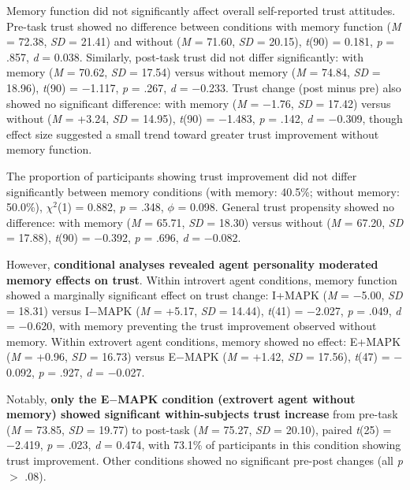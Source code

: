 \documentclass[12pt]{article}
\begin{document}
Memory function did not significantly affect overall self-reported trust attitudes. Pre-task trust showed no difference between conditions with memory function (\textit{M} = 72.38, \textit{SD} = 21.41) and without (\textit{M} = 71.60, \textit{SD} = 20.15), \textit{t}(90) = 0.181, \textit{p} = .857, \textit{d} = 0.038. Similarly, post-task trust did not differ significantly: with memory (\textit{M} = 70.62, \textit{SD} = 17.54) versus without memory (\textit{M} = 74.84, \textit{SD} = 18.96), \textit{t}(90) = $-$1.117, \textit{p} = .267, \textit{d} = $-$0.233. Trust change (post minus pre) also showed no significant difference: with memory (\textit{M} = $-$1.76, \textit{SD} = 17.42) versus without (\textit{M} = +3.24, \textit{SD} = 14.95), \textit{t}(90) = $-$1.483, \textit{p} = .142, \textit{d} = $-$0.309, though effect size suggested a small trend toward greater trust improvement without memory function.

The proportion of participants showing trust improvement did not differ significantly between memory conditions (with memory: 40.5\%; without memory: 50.0\%), $\chi^2$(1) = 0.882, \textit{p} = .348, $\phi$ = 0.098. General trust propensity showed no difference: with memory (\textit{M} = 65.71, \textit{SD} = 18.30) versus without (\textit{M} = 67.20, \textit{SD} = 17.88), \textit{t}(90) = $-$0.392, \textit{p} = .696, \textit{d} = $-$0.082.

However, \textbf{conditional analyses revealed agent personality moderated memory effects on trust}. Within introvert agent conditions, memory function showed a marginally significant effect on trust change: I+MAPK (\textit{M} = $-$5.00, \textit{SD} = 18.31) versus I$-$MAPK (\textit{M} = +5.17, \textit{SD} = 14.44), \textit{t}(41) = $-$2.027, \textit{p} = .049, \textit{d} = $-$0.620, with memory preventing the trust improvement observed without memory. Within extrovert agent conditions, memory showed no effect: E+MAPK (\textit{M} = +0.96, \textit{SD} = 16.73) versus E$-$MAPK (\textit{M} = +1.42, \textit{SD} = 17.56), \textit{t}(47) = $-$0.092, \textit{p} = .927, \textit{d} = $-$0.027.

Notably, \textbf{only the E$-$MAPK condition (extrovert agent without memory) showed significant within-subjects trust increase} from pre-task (\textit{M} = 73.85, \textit{SD} = 19.77) to post-task (\textit{M} = 75.27, \textit{SD} = 20.10), paired \textit{t}(25) = $-$2.419, \textit{p} = .023, \textit{d} = 0.474, with 73.1\% of participants in this condition showing trust improvement. Other conditions showed no significant pre-post changes (all \textit{p} $>$ .08).
\end{document}
